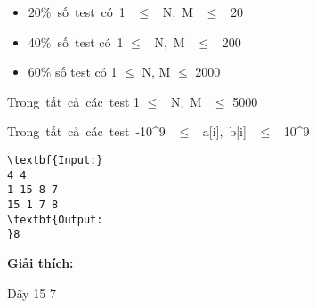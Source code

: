 \begin{itemize}
	\item 20\% số test có 1  $\le$  N, M  $\le$  20
	\item 40\% số test có 1  $\le$  N, M  $\le$  200
	\item 60\% số test có 1  $\le$  N, M  $\le$  2000
\end{itemize}

Trong tất cả các test 1 $\le$  N, M  $\le$  5000

Trong tất cả các test -10^9  $\le$  a[i], b[i]  $\le$  10^9
\begin{verbatim}
\textbf{Input:} 
4 4
1 15 8 7
15 1 7 8 
\textbf{Output:
}8\end{verbatim}

\textbf{Giải thích:}

Dãy 15 7